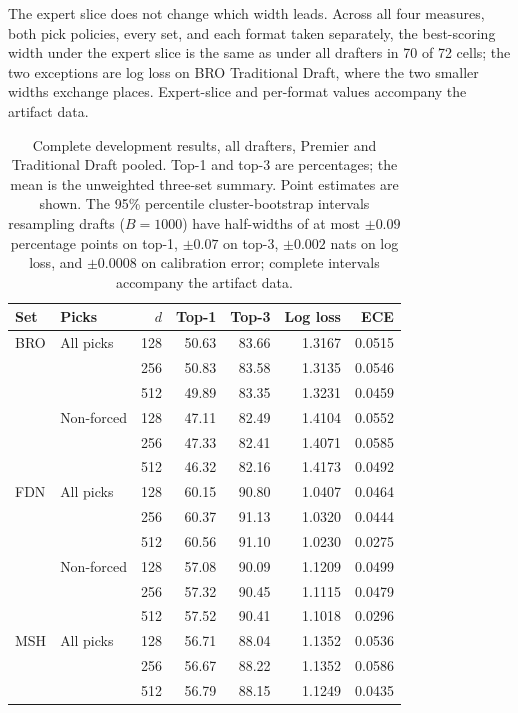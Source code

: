 \documentclass[11pt]{article}
\numberwithin{equation}{section}
\begin{document}
The expert slice does not change which width leads. Across all four measures,
both pick policies, every set, and each format taken separately, the best-scoring
width under the expert slice is the same as under all drafters in 70 of 72 cells;
the two exceptions are log loss on BRO Traditional Draft, where the two smaller
widths exchange places. Expert-slice and per-format values accompany the artifact
data.

\begin{table}[tb]
\centering
\caption{Complete development results, all drafters, Premier and Traditional
Draft pooled. Top-1 and top-3 are percentages; the mean is the unweighted
three-set summary. Point estimates are shown. The 95\% percentile
cluster-bootstrap intervals resampling drafts ($B=1000$) have half-widths of at
most $\pm0.09$ percentage points on top-1, $\pm0.07$ on top-3, $\pm0.002$ nats on
log loss, and $\pm0.0008$ on calibration error; complete intervals accompany the
artifact data.}
\label{app:res-all}
{\small
\setlength{\tabcolsep}{8pt}
\begin{tabular}{llrrrrr}
\toprule
Set & Picks & $d$ & Top-1 & Top-3 & Log loss & ECE \\
\midrule
BRO & All picks & 128 & 50.63 & 83.66 & 1.3167 & 0.0515 \\
 &  & 256 & 50.83 & 83.58 & 1.3135 & 0.0546 \\
 &  & 512 & 49.89 & 83.35 & 1.3231 & 0.0459 \\
\addlinespace
 & Non-forced & 128 & 47.11 & 82.49 & 1.4104 & 0.0552 \\
 &  & 256 & 47.33 & 82.41 & 1.4071 & 0.0585 \\
 &  & 512 & 46.32 & 82.16 & 1.4173 & 0.0492 \\
\midrule
FDN & All picks & 128 & 60.15 & 90.80 & 1.0407 & 0.0464 \\
 &  & 256 & 60.37 & 91.13 & 1.0320 & 0.0444 \\
 &  & 512 & 60.56 & 91.10 & 1.0230 & 0.0275 \\
\addlinespace
 & Non-forced & 128 & 57.08 & 90.09 & 1.1209 & 0.0499 \\
 &  & 256 & 57.32 & 90.45 & 1.1115 & 0.0479 \\
 &  & 512 & 57.52 & 90.41 & 1.1018 & 0.0296 \\
\midrule
MSH & All picks & 128 & 56.71 & 88.04 & 1.1352 & 0.0536 \\
 &  & 256 & 56.67 & 88.22 & 1.1352 & 0.0586 \\
 &  & 512 & 56.79 & 88.15 & 1.1249 & 0.0435 \\

\end{tabular}}
\end{table}
\end{document}
